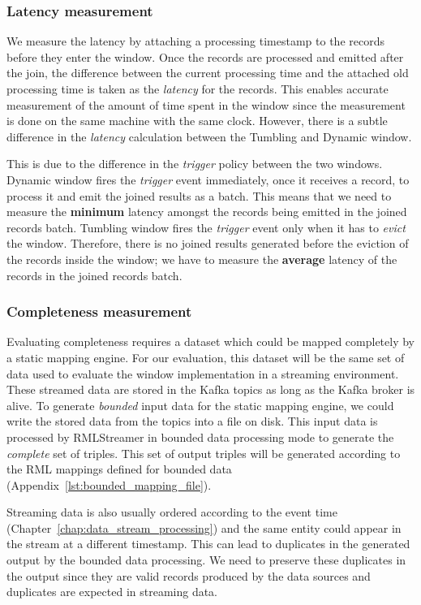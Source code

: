 \subsubsection{Latency measurement}%
\label{ssub:Latency measurement}
We measure the latency by attaching a processing timestamp to the records before they enter the window. 
Once the records are processed and emitted after the join, the difference 
between the current processing time and the attached old processing time 
is taken as the \emph{latency} for the records. This enables accurate measurement of
the amount of time spent in the window since the measurement is done on the 
same machine with the same clock. However, there is a subtle difference
in the \emph{latency} calculation between the Tumbling and Dynamic window.


This is due to the difference in the \emph{trigger} policy between the two windows. 
Dynamic window fires the \emph{trigger} event immediately, once it receives a record, 
to process it and emit the joined results as a batch. This means that we need to measure the 
\textbf{minimum} latency amongst the records being emitted in the joined records batch. 
Tumbling window fires the \emph{trigger} event only when it has to \emph{evict} the window. 
Therefore, there is no joined results generated before the eviction of the records 
inside the window; we have to measure the \textbf{average} latency of the records in the joined 
records batch. 

\subsubsection{Completeness measurement}%
\label{ssub:Completeness measurement}
Evaluating completeness requires a dataset which could be mapped completely by a static 
mapping engine. For our evaluation, this dataset will be the same set of data used to 
evaluate the window implementation in a streaming environment. These streamed data are 
stored in the Kafka topics as long as the Kafka broker is alive. 
To generate \emph{bounded} input data for 
the static mapping engine, we could write the stored data from the topics 
into a file on disk. This input data is processed by RMLStreamer in bounded data 
processing mode to generate the \emph{complete} set of triples. 
This set of output triples will be generated according 
to the RML mappings defined for bounded data (Appendix~\ref{lst:bounded_mapping_file}). 

Streaming data is also usually 
ordered according to the event time (Chapter~\ref{chap:data_stream_processing}) 
and the same entity could appear in the 
stream at a different timestamp. This can lead to duplicates in the generated output by 
the bounded data processing. We need to preserve these duplicates in the 
output since they are valid records produced by the data sources and duplicates are 
expected in streaming data. 


